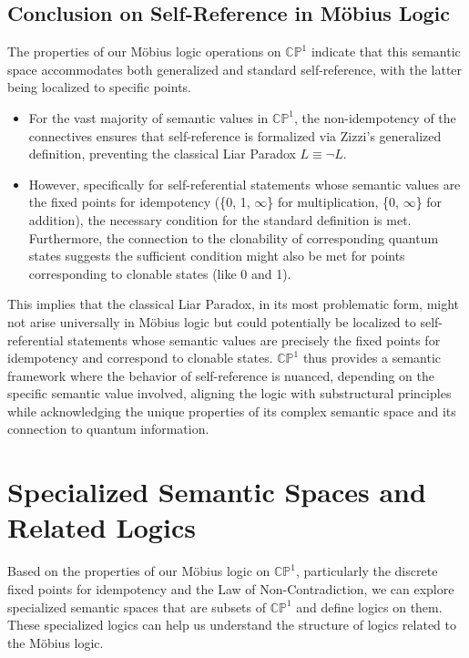 	\subsection{Conclusion on Self-Reference in Möbius Logic}
	
	The properties of our M\"{o}bius logic operations on \(\mathbb{CP}^1\) indicate that this semantic space accommodates both generalized and standard self-reference, with the latter being localized to specific points.
	
	\begin{itemize}
		\item For the vast majority of semantic values in \(\mathbb{CP}^1\), the non-idempotency of the connectives ensures that self-reference is formalized via Zizzi's generalized definition, preventing the classical Liar Paradox \(L \equiv \neg L\).
		\item However, specifically for self-referential statements whose semantic values are the fixed points for idempotency (\{0, 1, \(\infty\)\} for multiplication, \{0, \(\infty\)\} for addition), the necessary condition for the standard definition is met. Furthermore, the connection to the clonability of corresponding quantum states suggests the sufficient condition might also be met for points corresponding to clonable states (like 0 and 1).
	\end{itemize}
	This implies that the classical Liar Paradox, in its most problematic form, might not arise universally in M\"{o}bius logic but could potentially be localized to self-referential statements whose semantic values are precisely the fixed points for idempotency and correspond to clonable states. \(\mathbb{CP}^1\) thus provides a semantic framework where the behavior of self-reference is nuanced, depending on the specific semantic value involved, aligning the logic with substructural principles while acknowledging the unique properties of its complex semantic space and its connection to quantum information.
	
	\section{Specialized Semantic Spaces and Related Logics}
	
	Based on the properties of our M\"{o}bius logic on $\mathbb{CP}^1$, particularly the discrete fixed points for idempotency and the Law of Non-Contradiction, we can explore specialized semantic spaces that are subsets of $\mathbb{CP}^1$ and define logics on them. These specialized logics can help us understand the structure of logics related to the M\"{o}bius logic.
	

